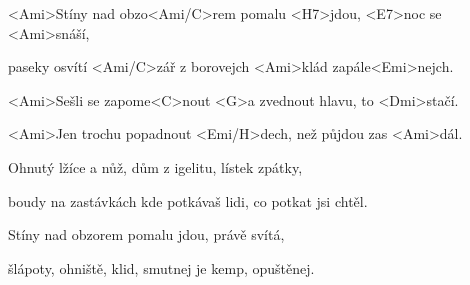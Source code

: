 

\zs
<Ami>Stíny nad obzo<Ami/C>rem pomalu <H7>jdou, <E7>noc se <Ami>snáší,

paseky osvítí <Ami/C>zář z borovejch <Ami>klád zapále<Emi>nejch.
\ks

\zr
<Ami>Sešli se zapome<C>nout <G>a zvednout hlavu, to <Dmi>stačí.

<Ami>Jen trochu popadnout <Emi/H>dech, než půjdou zas <Ami>dál.
\kr

\zs
Ohnutý lžíce a nůž, dům z igelitu, lístek zpátky,

boudy na zastávkách kde potkávaš lidi, co potkat jsi chtěl.
\ks

\zr \kr

\zs
Stíny nad obzorem pomalu jdou, právě svítá,

šlápoty, ohniště, klid, smutnej je kemp, opuštěnej.
\ks

\zr \kr

\kp
